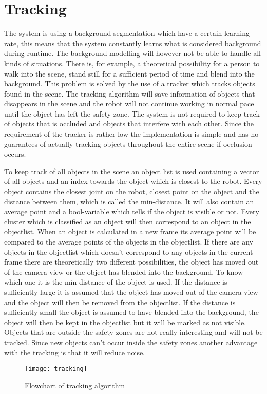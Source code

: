 
\section{Tracking}
The system is using a background segmentation which have a certain learning rate, this means that the system constantly learns what is considered background during runtime. The background modelling will however not be able to handle all kinds of situations. There is, for example, a theoretical possibility for a person to walk into the scene, stand still for a sufficient period of time and blend into the background. This problem is solved by the use of a tracker which tracks objects found in the scene. The tracking algorithm will save information of objects that disappears in the scene and the robot will not continue working in normal pace until the object has left the safety zone. The system is not required to keep track of objects that is occluded and objects that interfere with each other. Since the requirement of the tracker is rather low the implementation is simple and has no guarantees of actually tracking objects throughout the entire scene if occlusion occurs.

To keep track of all objects in the scene an object list is used containing a vector of all objects and an index towards the object which is closest to the robot. Every object contains the closest joint on the robot, closest point on the object and the distance between them, which is called the min-distance. It will also contain an average point and a bool-variable which tells if the object is visible or not.  Every cluster which is classified as an object will then correspond to an object in the objectlist. When an object is calculated in a new frame its average point will be compared to the average points of the objects in the objectlist. If there are any objects in the objectlist which doesn’t correspond to any objects in the current frame there are theoretically two different possibilities, the object has moved out of the camera view or the object has blended into the background. To know which one it is the min-distance of the object is used. If the distance is sufficiently large it is assumed that the object has moved out of the camera view and the object will then be removed from the objectlist. If the distance is sufficiently small the object is assumed to have blended into the background, the object will then be kept in the objectlist but it will be marked as not visible. Objects that are outside the safety zones are not really interesting and will not be tracked. Since new objects can’t occur inside the safety zones another advantage with the tracking is that it will reduce noise.

\begin{figure}[H]
\begin{center}
\texttt{[image: tracking]}
\caption{Flowchart of tracking algorithm}
\label{tracking}
\end{center}
\end{figure}
